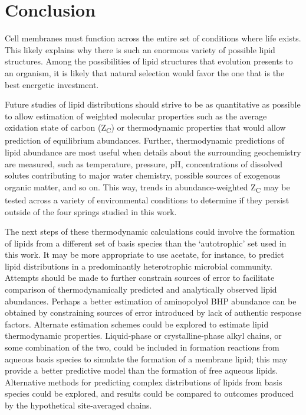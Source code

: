 \chapter[CONCLUSION]{Conclusion}

Cell membranes must function across the entire set of conditions where life exists. This likely explains why there is such an enormous variety of possible lipid structures. Among the possibilities of lipid structures that evolution presents to an organism, it is likely that natural selection would favor the one that is the best energetic investment.

Future studies of lipid distributions should strive to be as quantitative as possible to allow estimation of weighted molecular properties such as the average oxidation state of carbon (Z\textsubscript{C}) or thermodynamic properties that would allow prediction of equilibrium abundances. Further, thermodynamic predictions of lipid abundance are most useful when details about the surrounding geochemistry are measured, such as temperature, pressure, pH, concentrations of dissolved solutes contributing to major water chemistry, possible sources of exogenous organic matter, and so on. This way, trends in abundance-weighted Z\textsubscript{C} may be tested across a variety of environmental conditions to determine if they persist outside of the four springs studied in this work.

The next steps of these thermodynamic calculations could involve the formation of lipids from a different set of basis species than the `autotrophic' set used in this work. It may be more appropriate to use acetate, for instance, to predict lipid distributions in a predominantly heterotrophic microbial community. Attempts should be made to further constrain sources of error to facilitate comparison of thermodynamically predicted and analytically observed lipid abundances. Perhaps a better estimation of aminopolyol BHP abundance can be obtained by constraining sources of error introduced by lack of authentic response factors. Alternate estimation schemes could be explored to estimate lipid thermodynamic properties. Liquid-phase or crystalline-phase alkyl chains, or some combination of the two, could be included in formation reactions from aqueous basis species to simulate the formation of a membrane lipid; this may provide a better predictive model than the formation of free aqueous lipids. Alternative methods for predicting complex distributions of lipids from basis species could be explored, and results could be compared to outcomes produced by the hypothetical site-averaged chains.

